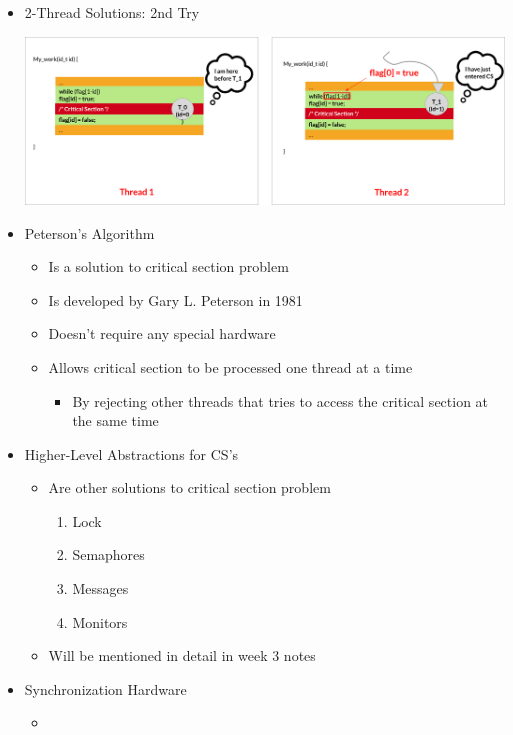 \documentclass[12pt]{article}
\begin{document}
\begin{itemize}
    \item 2-Thread Solutions: 2nd Try


    \begin{center}
    \includegraphics[width=\linewidth]{images/week_2_notes_2_12.png}
    \end{center}

    \item Peterson's Algorithm

    \begin{itemize}
        \item Is a solution to critical section problem
        \item Is developed by Gary L. Peterson in 1981
        \item Doesn't require any special hardware
        \item Allows critical section to be processed one thread at a time
        \begin{itemize}
            \item By rejecting other threads that tries to access the
            critical section at the same time
        \end{itemize}
    \end{itemize}

    \item Higher-Level Abstractions for CS's
    \begin{itemize}
        \item Are other solutions to critical section problem
        \begin{enumerate}[1.]
            \item Lock
            \item Semaphores
            \item Messages
            \item Monitors
        \end{enumerate}
        \item Will be mentioned in detail in week 3 notes
    \end{itemize}

    \item Synchronization Hardware
    \begin{itemize}
        \item
    \end{itemize}
\end{itemize}
\end{document}
